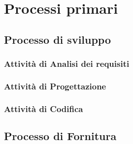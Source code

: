 
\chapter{Processi primari}
	\section{Processo di sviluppo}
		\subsection{Attività di Analisi dei requisiti}
			
			
			
			
			
			
		\subsection{Attività di Progettazione}
		
		 
		
		 
		
		\subsection{Attività di Codifica}
		
	\section{Processo di Fornitura}
